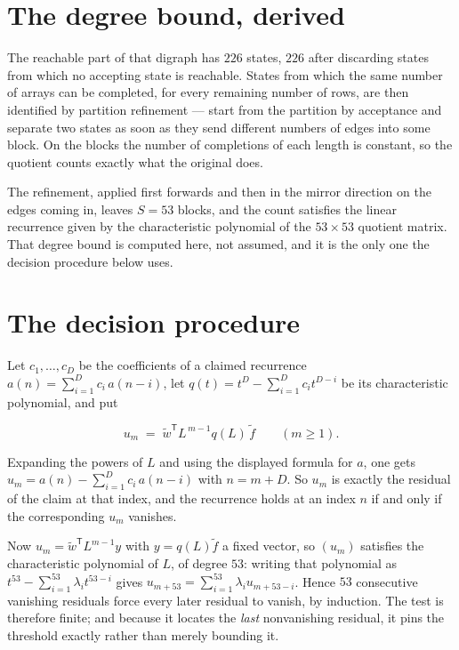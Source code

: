 \documentclass[11pt]{article}
\theoremstyle{definition}
\begin{document}
\section{The degree bound, derived}

The reachable part of that digraph has $226$ states, $226$ after discarding states from which no accepting state is reachable. States from which the same number of arrays can be completed, for every remaining number of rows, are then identified by partition refinement --- start from the partition by acceptance and separate two states as soon as they send different numbers of edges into some block. On the blocks the number of completions of each length is constant, so the quotient counts exactly what the original does.

The refinement, applied first forwards and then in the mirror direction on the edges coming in, leaves $S = 53$ blocks, and the count satisfies the linear recurrence given by the characteristic polynomial of the $53 \times 53$ quotient matrix. That degree bound is computed here, not assumed, and it is the only one the decision procedure below uses.

\section{The decision procedure}

Let $c_1,\dots,c_D$ be the coefficients of a claimed recurrence $a(n) = \sum_{i=1}^{D} c_i\,a(n-i)$, let $q(t) = t^{D} - \sum_{i=1}^{D} c_i t^{D-i}$ be its characteristic polynomial, and put

\[u_m \;=\; \tilde w^{\mathsf T} L^{\,m-1} q(L)\,\tilde f \qquad (m \ge 1).\]

Expanding the powers of $L$ and using the displayed formula for $a$, one gets $u_m = a(n) - \sum_{i=1}^{D} c_i\,a(n-i)$ with $n = m + D$. So $u_m$ is exactly the residual of the claim at that index, and the recurrence holds at an index $n$ if and only if the corresponding $u_m$ vanishes.

Now $u_m = \tilde w^{\mathsf T} L^{m-1} y$ with $y = q(L)\tilde f$ a fixed vector, so $(u_m)$ satisfies the characteristic polynomial of $L$, of degree $53$: writing that polynomial as $t^{53} - \sum_{i=1}^{53} \lambda_i t^{53-i}$ gives $u_{m+53} = \sum_{i=1}^{53} \lambda_i u_{m+53-i}$. Hence $53$ consecutive vanishing residuals force every later residual to vanish, by induction. The test is therefore finite; and because it locates the {\itshape last} nonvanishing residual, it pins the threshold exactly rather than merely bounding it.
\end{document}
